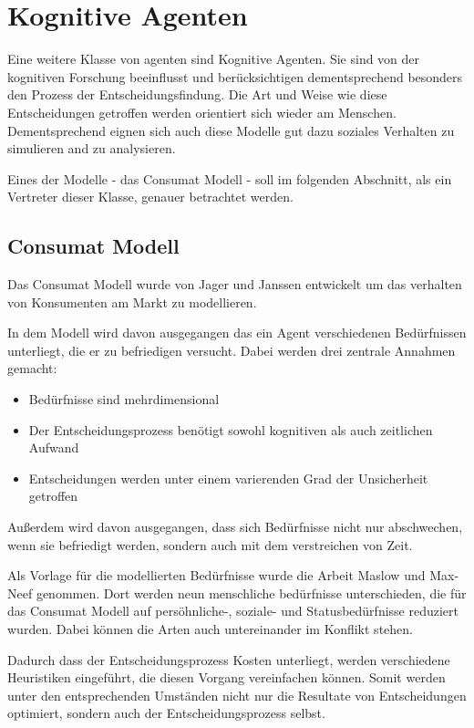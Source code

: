 \chapter{Kognitive Agenten}
Eine weitere Klasse von agenten sind Kognitive Agenten.
Sie sind von der kognitiven Forschung beeinflusst und berücksichtigen dementsprechend besonders den Prozess der Entscheidungsfindung.
Die Art und Weise wie diese Entscheidungen getroffen werden orientiert sich wieder am Menschen.
Dementsprechend eignen sich auch diese Modelle gut dazu soziales Verhalten zu simulieren and zu analysieren.

Eines der Modelle - das Consumat Modell - soll im folgenden Abschnitt, als ein Vertreter dieser Klasse, genauer betrachtet werden.

\section{Consumat Modell}
Das Consumat Modell wurde von Jager und Janssen entwickelt um das verhalten von Konsumenten am Markt zu modellieren\cite{}.%

In dem Modell wird davon ausgegangen das ein Agent verschiedenen Bedürfnissen unterliegt, die er zu befriedigen versucht.
Dabei werden drei zentrale Annahmen gemacht:
\begin{itemize}
    \item Bedürfnisse sind mehrdimensional
    \item Der Entscheidungsprozess benötigt sowohl kognitiven als auch zeitlichen Aufwand
    \item Entscheidungen werden unter einem varierenden Grad der Unsicherheit getroffen
\end{itemize}
Außerdem wird davon ausgegangen, dass sich Bedürfnisse nicht nur abschwechen, wenn sie befriedigt werden, sondern auch mit dem verstreichen von Zeit.

Als Vorlage für die modellierten Bedürfnisse wurde die Arbeit Maslow\cite{} und Max-Neef genommen.
Dort werden neun menschliche bedürfnisse unterschieden, die für das Consumat Modell auf persöhnliche-, soziale- und Statusbedürfnisse reduziert wurden.
Dabei können die Arten auch untereinander im Konflikt stehen.

Dadurch dass der Entscheidungsprozess Kosten unterliegt, werden verschiedene Heuristiken eingeführt, die diesen Vorgang vereinfachen können.
Somit werden unter den entsprechenden Umständen nicht nur die Resultate von Entscheidungen optimiert, sondern auch der Entscheidungsprozess selbst.


